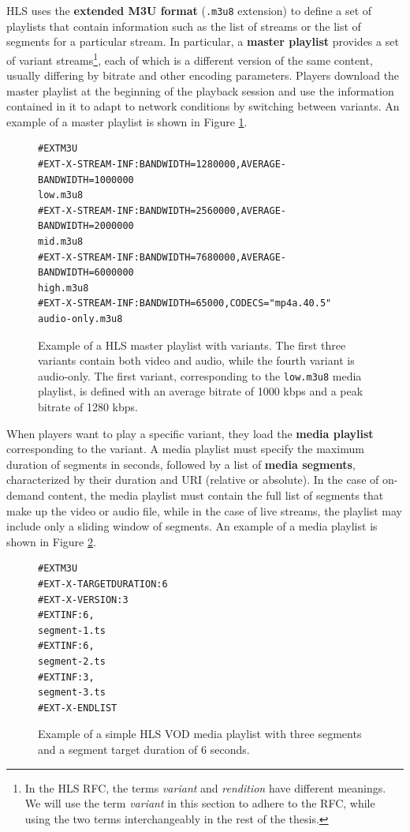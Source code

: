 HLS uses the \textbf{extended M3U format} (\texttt{.m3u8} extension) to define a set of playlists that contain information such as the list of streams or the list of segments for a particular stream. In particular, a \textbf{master playlist} provides a set of variant streams\footnote{In the HLS RFC, the terms \textit{variant} and \textit{rendition} have different meanings. We will use the term \textit{variant} in this section to adhere to the RFC, while using the two terms interchangeably in the rest of the thesis.}, each of which is a different version of the same content, usually differing by bitrate and other encoding parameters. Players download the master playlist at the beginning of the playback session and use the information contained in it to adapt to network conditions by switching between variants. An example of a master playlist is shown in Figure \ref{fig:hls_master}.

\begin{figure}[h]
    \centering
    \begin{verbatim}
#EXTM3U
#EXT-X-STREAM-INF:BANDWIDTH=1280000,AVERAGE-BANDWIDTH=1000000
low.m3u8
#EXT-X-STREAM-INF:BANDWIDTH=2560000,AVERAGE-BANDWIDTH=2000000
mid.m3u8
#EXT-X-STREAM-INF:BANDWIDTH=7680000,AVERAGE-BANDWIDTH=6000000
high.m3u8
#EXT-X-STREAM-INF:BANDWIDTH=65000,CODECS="mp4a.40.5"
audio-only.m3u8
    \end{verbatim}
	\caption{Example of a HLS master playlist with variants. The first three variants contain both video and audio, while the fourth variant is audio-only. The first variant, corresponding to the \texttt{low.m3u8} media playlist, is defined with an average bitrate of 1000 kbps and a peak bitrate of 1280 kbps.}
	\label{fig:hls_master}
\end{figure}

When players want to play a specific variant, they load the \textbf{media playlist} corresponding to the variant. A media playlist must specify the maximum duration of segments in seconds, followed by a list of \textbf{media segments}, characterized by their duration and URI (relative or absolute). In the case of on-demand content, the media playlist must contain the full list of segments that make up the video or audio file, while in the case of live streams, the playlist may include only a sliding window of segments. An example of a media playlist is shown in Figure \ref{fig:hls_media}.

\begin{figure}[h]
    \centering
    \begin{verbatim}
#EXTM3U
#EXT-X-TARGETDURATION:6
#EXT-X-VERSION:3
#EXTINF:6,
segment-1.ts
#EXTINF:6,
segment-2.ts
#EXTINF:3,
segment-3.ts
#EXT-X-ENDLIST
    \end{verbatim}
	\caption{Example of a simple HLS VOD media playlist with three segments and a segment target duration of 6 seconds.}
	\label{fig:hls_media}
\end{figure}

